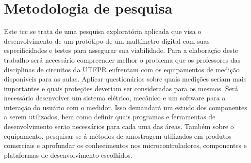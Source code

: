 \section{Metodologia de pesquisa}\label{sec:metodologiapesq}
Este \gls{tcc} se trata de uma pesquisa exploratória aplicada que visa o desenvolvimento de um protótipo de um multímetro digital com suas especificidades e testes para assegurar sua viabilidade. 
Para a elaboração deste trabalho será necessário compreender melhor o problema que os professores das disciplinas de circuitos da UTFPR enfrentam com os equipamentos de medição disponíveis para as aulas. Aplicar questionários sobre quais medições seriam mais importantes e quais proteções deveriam ser consideradas para os mesmos.
Será necessário desenvolver um sistema elétrico, mecânico e um software para a interação do usuário com o medidor. Isso demandará um estudo dos componentes a serem utilizados, bem como definir quais programas e ferramentas de desenvolvimento serão necessários para cada uma das áreas.
Também sobre o equipamento, pesquisar-se-á métodos de amostragem utilizados em produtos comerciais e aprofundar os conhecimentos nos microcontroladores, componentes e plataformas de desenvolvimento escolhidos.






